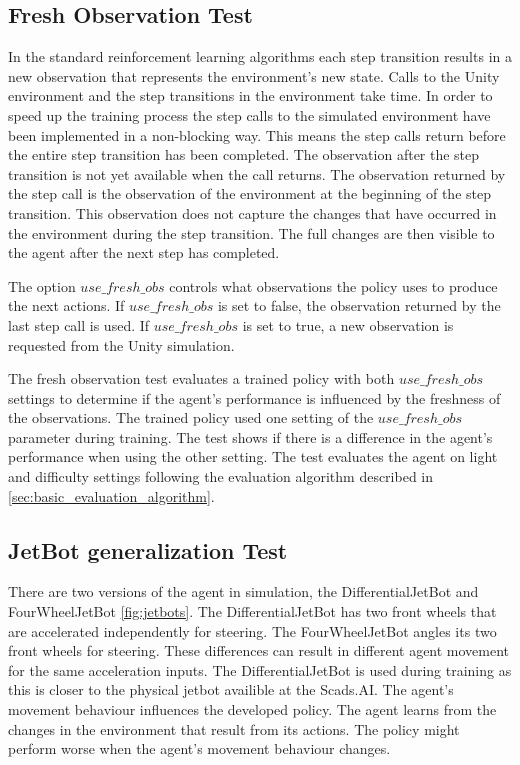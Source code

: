 \subsection{Fresh Observation Test}

In the standard reinforcement learning algorithms each step transition results in a new observation that represents the environment's new state. Calls to the Unity environment and the step transitions in the environment take time. In order to speed up the training process the step calls to the simulated environment have been implemented in a non-blocking way. This means the step calls return before the entire step transition has been completed. The observation after the step transition is not yet available when the call returns. The observation returned by the step call is the observation of the environment at the beginning of the step transition. This observation does not capture the changes that have occurred in the environment during the step transition. The full changes are then visible to the agent after the next step has completed.

The option $use\_fresh\_obs$ controls what observations the policy uses to produce the next actions. If $use\_fresh\_obs$ is set to false, the observation returned by the last step call is used. If $use\_fresh\_obs$ is set to true, a new observation is requested from the Unity simulation.

The fresh observation test evaluates a trained policy with both $use\_fresh\_obs$ settings to determine if the agent's performance is influenced by the freshness of the observations. The trained policy used one setting of the $use\_fresh\_obs$ parameter during training. The test shows if there is a difference in the agent's performance when using the other setting. The test evaluates the agent on light and difficulty settings following the evaluation algorithm described in \ref{sec:basic_evaluation_algorithm}.


\subsection{JetBot generalization Test}

There are two versions of the agent in simulation, the DifferentialJetBot and FourWheelJetBot \ref{fig:jetbots}. The DifferentialJetBot has two front wheels that are accelerated independently for steering. The FourWheelJetBot angles its two front wheels for steering. These differences can result in different agent movement for the same acceleration inputs. The DifferentialJetBot is used during training as this is closer to the physical jetbot availible at the Scads.AI.
The agent's movement behaviour influences the developed policy. The agent learns from the changes in the environment that result from its actions. The policy might perform worse when the agent's movement behaviour changes.

